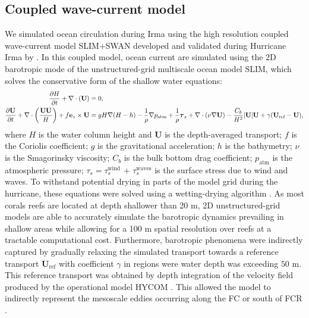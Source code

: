 \documentclass[fleqn,10pt]{wlscirep}
\newcommand{\UV}{\mathbf{U}}
\begin{document}
\subsection{Coupled wave-current model}
We simulated ocean circulation during Irma using the high resolution coupled wave-current model SLIM+SWAN developed and validated during Hurricane Irma by \citep{DobbyIrma}. In this coupled model, ocean current are simulated using the 2D barotropic mode of the unstructured-grid multiscale ocean model SLIM, which solves the conservative form of the shallow water equations:
\begin{align}
\dfrac{\partial H}{\partial t} +\nabla\cdot(\UV) &= 0, \label{eq:slim_1}\\
\dfrac{\partial \UV}{\partial t}  + \nabla\cdot\left(\dfrac{\UV\UV}{H}\right) + f\mathbf{e}_z \times \UV &= gH\nabla(H-h) - \dfrac{1}{\rho}\nabla p_\text{atm} + \dfrac{1}{\rho}\text{\boldmath$\tau$}_s +\nabla\cdot(\nu\nabla\UV) - \dfrac{C_b}{H^2}|\UV|\UV + \gamma(\UV_\text{ref}-\UV), \label{eq:slim_2}
\end{align}
where $H$ is the water column height and $\UV$ is the depth-averaged transport; $f$ is the Coriolis coefficient; $g$ is the gravitational acceleration; $h$ is the bathymetry; $\nu$  is the Smagorinsky viscosity; $C_b$ is the bulk bottom drag coefficient; $p_\text{atm}$ is the atmospheric pressure; {\boldmath$\tau$}$_s = ${\boldmath$\tau$}$_s^\text{wind}$ + {\boldmath$\tau$}$_s^\text{waves}$ is the surface stress due to wind and waves. To withstand potential drying in parts of the model grid during the hurricane, these equations were solved using a wetting-drying algorithm \citep{Le2020Aug}. As most corals reefs are located at depth shallower than 20 m, 2D unstructured-grid models are able to accurately simulate the barotropic dynamics prevailing in shallow areas while allowing for a 100 m spatial resolution over reefs at a tractable computational cost. Furthermore, barotropic phenomena were indirectly captured by gradually relaxing the simulated transport towards a reference transport $\UV_\text{ref}$ with coefficient $\gamma$ in regions were water depth was exceeding $50$ m. This reference transport was obtained by depth integration of the velocity field produced by the operational model HYCOM \citep{Chassignet2007Mar}. This allowed the model to indirectly represent the mesoscale eddies occurring along the FC or south of FCR \citep{Frys2020}.
\end{document}
